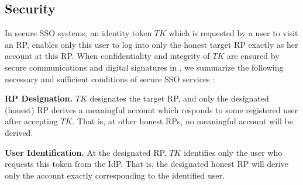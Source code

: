 \subsection{Security}
\label{analysis-security}

In secure SSO systems, an identity token $TK$ which is requested by a user to visit an RP,
    enables only this user to log into only the honest target RP exactly as her account at this RP.
When confidentiality and integrity of $TK$ are ensured by secure communications and digital signatures in \usso, we summarize the following necessary and sufficient conditions of secure SSO services \cite{FettKS14,BrowserID,SPRESSO}:

\noindent \textbf{RP Designation.} $TK$ designates the target RP,
    and only the designated (honest) RP derives a meaningful account which responds to some registered user after accepting $TK$.
That is, at other honest RPs, no meaningful account will be derived.

\noindent \textbf{User Identification.} At the designated RP, $TK$ identifies only the user who requests this token from the IdP. That is, the designated honest RP will derive only the account exactly corresponding to the identified user.



